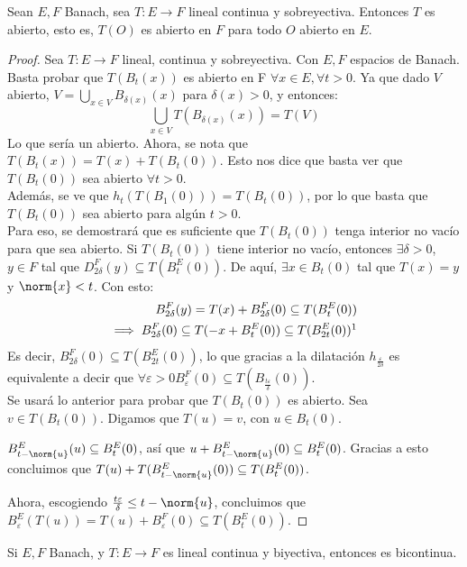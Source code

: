 \documentclass{notetaking}
\begin{document}
\begin{thm}
    Sean \(E,F\) Banach, sea \(T:E\rightarrow F\) lineal continua y sobreyectiva. Entonces \(T\) es abierto, esto es, \(T(O)\) es abierto en \(F\) para todo \(O\) abierto en \(E\).
\end{thm}
\begin{proof}
    Sea \(T:E\rightarrow F\) lineal, continua y sobreyectiva. Con \(E,F\) espacios de Banach. Basta probar que \(T(B_t(x))\) es abierto en F \(\forall x\in E,\forall t>0\). Ya que dado \(V\) abierto, \(V=\bigcup_{x\in V}B_{\delta(x)}(x)\) para \(\delta(x)>0\), y entonces:
    \begin{equation*}
        \bigcup_{x\in V}T(B_{\delta(x)}(x))=T(V)
    \end{equation*}
    Lo que sería un abierto. Ahora, se nota que \(T(B_t(x))=T(x)+T(B_t(0))\). Esto nos dice que basta ver que \(T(B_t(0))\) sea abierto \(\forall t>0\).\\
    Además, se ve que \(h_t(T(B_1(0)))=T(B_t(0))\), por lo que basta que \(T(B_t(0))\) sea abierto para algún \(t>0\).\\
    Para eso, se demostrará que es suficiente que \(T(B_t(0))\) tenga interior no vacío para que sea abierto. Si \(T(B_t(0))\) tiene interior no vacío, entonces \(\exists\delta>0\), \(y\in F\) tal que \(D_{2\delta}^F(y)\subseteq T(B_t^E(0))\). De aquí, \(\exists x\in B_t(0)\) tal que \(T(x)=y\) y \(\norm{x}<t\). Con esto:
    \begin{align*}
        B_{2\delta}^F(y)=T(x)+B_{2\delta}^F(0) \subseteq T(B_t^E(0)) \\
        \implies B_{2\delta}^F(0) \subseteq T(-x + B_t^E(0)) \subseteq T(B_{2t}^E(0))\footnotemark
    \end{align*}
    Es decir, \(B_{2\delta}^F(0)\subseteq T(B_{2t}^E(0))\), lo que gracias a la dilatación \(h_{\frac\varepsilon{2\delta}}\) es equivalente a decir que \(\forall\varepsilon>0 B_\varepsilon^F(0)\subseteq T(B_{\frac{t\varepsilon}\delta}(0))\).\\
    Se usará lo anterior para probar que \(T(B_t(0))\) es abierto. Sea \(v\in T(B_t(0))\). Digamos que \(T(u)=v\), con \(u\in B_t(0)\).
    \begin{obs}
        \(B_{t-\norm{u}}^E(u)\subseteq B_t^E(0)\), así que \(u+B_{t-\norm{u}}^E(0)\subseteq B_t^E(0)\). Gracias a esto concluimos que \(T(u)+T(B_{t-\norm{u}}^E(0))\subseteq T(B_t^E(0))\).
    \end{obs}
    Ahora, escogiendo \(\frac{t\varepsilon}\delta\leq t-\norm{u}\), concluimos que \(B_\varepsilon^E(T(u))=T(u)+B_\varepsilon^F(0)\subseteq T(B_t^E(0))\).
\end{proof}
\begin{cor}
    Si \(E,F\) Banach, y \(T:E\rightarrow F\) es lineal continua y biyectiva, entonces es bicontinua.
\end{cor}
\end{document}
